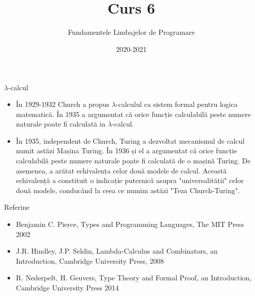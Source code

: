 \documentclass[xcolor=pdftex,romanian,colorlinks]{beamer}
\begin{document}
\title{\\Curs 6}
\author{Fundamentele Limbajelor de Programare} 
\date{2020-2021} 

\frame{\titlepage} 

 


\begin{frame}{$\lambda$-calcul}

\begin{itemize}
\item În 1929-1932 Church a propus 
$\lambda$-calculul ca sistem formal pentru logica matematică.
În 1935 a argumentat că orice funcție calculabilă peste numere naturale poate
fi calculată in $\lambda$-calcul.

\item În 1935, independent de Church, Turing a dezvoltat mecanismul de calcul
numit astăzi Mașina Turing. 
În 1936 și el a argumentat câ orice funcție calculabilă peste numere naturale poate
fi calculată de o mașină Turing.
De asemenea, a arătat echivalența celor două modele de calcul.
Această echivalență a constituit o indicație puternică asupra "universalității" 
celor două modele, conducând la ceea ce numim astăzi "Teza Church-Turing".
\end{itemize}
\end{frame}

\begin{frame}{Referin\ts e}

\begin{itemize}
\item Benjamin C. Pierce, Types and Programming Languages, The MIT Press 2002
\bigskip
 
\item J.R. Hindley, J.P. Seldin, Lambda-Calculus and Combinators, an Introduction, Cambridge University Press, 2008
\bigskip

\item R. Nederpelt, H. Geuvers, Type Theory and Formal Proof, an Introduction, Cambridge University Press 2014

\end{itemize}
\end{frame}
\end{document}
